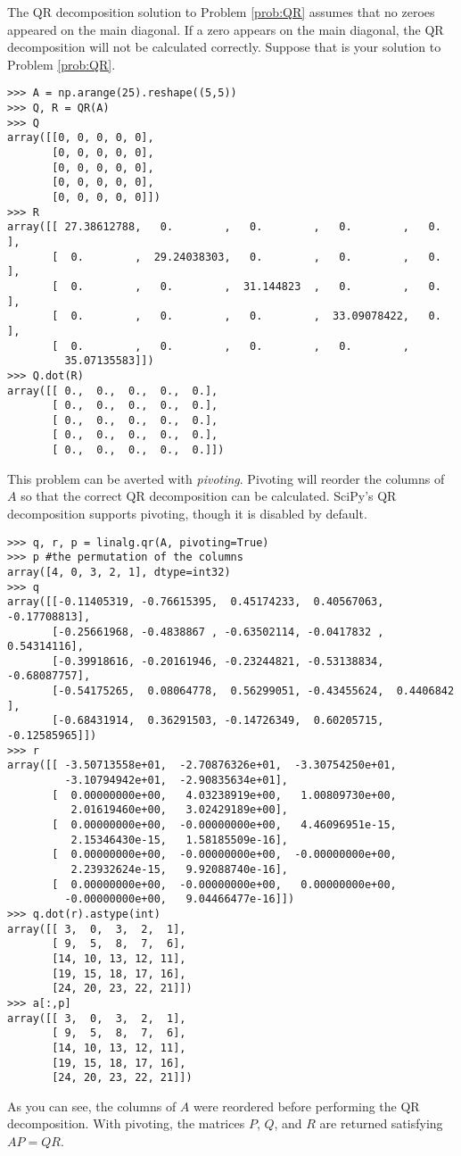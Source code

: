 The QR decomposition solution to Problem \ref{prob:QR} assumes that no zeroes appeared on the main diagonal.
If a zero appears on the main diagonal, the QR decomposition will not be calculated correctly.
Suppose that  is your solution to Problem \ref{prob:QR}.
\begin{lstlisting}
>>> A = np.arange(25).reshape((5,5))
>>> Q, R = QR(A)
>>> Q
array([[0, 0, 0, 0, 0],
       [0, 0, 0, 0, 0],
       [0, 0, 0, 0, 0],
       [0, 0, 0, 0, 0],
       [0, 0, 0, 0, 0]])
>>> R
array([[ 27.38612788,   0.        ,   0.        ,   0.        ,   0.        ],
       [  0.        ,  29.24038303,   0.        ,   0.        ,   0.        ],
       [  0.        ,   0.        ,  31.144823  ,   0.        ,   0.        ],
       [  0.        ,   0.        ,   0.        ,  33.09078422,   0.        ],
       [  0.        ,   0.        ,   0.        ,   0.        ,
         35.07135583]])
>>> Q.dot(R)
array([[ 0.,  0.,  0.,  0.,  0.],
       [ 0.,  0.,  0.,  0.,  0.],
       [ 0.,  0.,  0.,  0.,  0.],
       [ 0.,  0.,  0.,  0.,  0.],
       [ 0.,  0.,  0.,  0.,  0.]])
\end{lstlisting}
This problem can be averted with \emph{pivoting}.  
Pivoting will reorder the columns of $A$ so that the correct QR decomposition can be calculated.
SciPy's QR decomposition supports pivoting, though it is disabled by default.
\begin{lstlisting}
>>> q, r, p = linalg.qr(A, pivoting=True)
>>> p #the permutation of the columns
array([4, 0, 3, 2, 1], dtype=int32)
>>> q
array([[-0.11405319, -0.76615395,  0.45174233,  0.40567063, -0.17708813],
       [-0.25661968, -0.4838867 , -0.63502114, -0.0417832 ,  0.54314116],
       [-0.39918616, -0.20161946, -0.23244821, -0.53138834, -0.68087757],
       [-0.54175265,  0.08064778,  0.56299051, -0.43455624,  0.4406842 ],
       [-0.68431914,  0.36291503, -0.14726349,  0.60205715, -0.12585965]])
>>> r
array([[ -3.50713558e+01,  -2.70876326e+01,  -3.30754250e+01,
         -3.10794942e+01,  -2.90835634e+01],
       [  0.00000000e+00,   4.03238919e+00,   1.00809730e+00,
          2.01619460e+00,   3.02429189e+00],
       [  0.00000000e+00,  -0.00000000e+00,   4.46096951e-15,
          2.15346430e-15,   1.58185509e-16],
       [  0.00000000e+00,  -0.00000000e+00,  -0.00000000e+00,
          2.23932624e-15,   9.92088740e-16],
       [  0.00000000e+00,  -0.00000000e+00,   0.00000000e+00,
         -0.00000000e+00,   9.04466477e-16]])
>>> q.dot(r).astype(int)
array([[ 3,  0,  3,  2,  1],
       [ 9,  5,  8,  7,  6],
       [14, 10, 13, 12, 11],
       [19, 15, 18, 17, 16],
       [24, 20, 23, 22, 21]])
>>> a[:,p]
array([[ 3,  0,  3,  2,  1],
       [ 9,  5,  8,  7,  6],
       [14, 10, 13, 12, 11],
       [19, 15, 18, 17, 16],
       [24, 20, 23, 22, 21]])
\end{lstlisting}
As you can see, the columns of $A$ were reordered before performing the QR decomposition.
With pivoting, the matrices $P$, $Q$, and $R$ are returned satisfying $AP = QR$.



